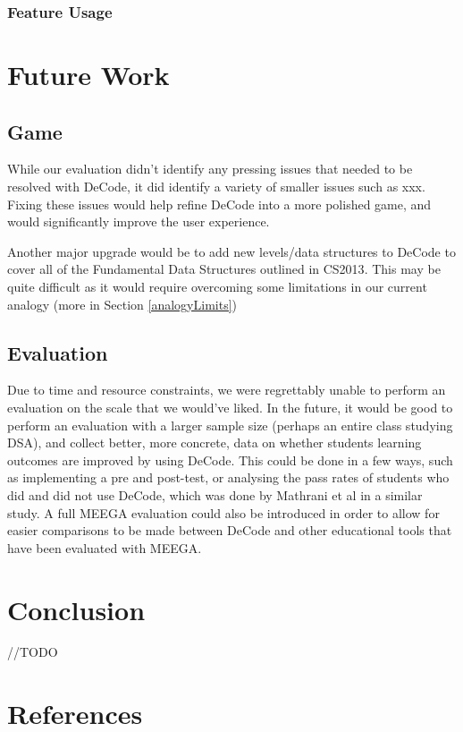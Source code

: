 \documentclass[10pt]{article}
\begin{document}
\subsubsection{Feature Usage}
\section{Future Work}
\subsection{Game}
While our evaluation didn't identify any pressing issues that needed to be resolved with DeCode, it did identify a variety of smaller issues such as xxx. Fixing these issues would help refine DeCode into a more polished game, and would significantly improve the user experience.\par
Another major upgrade would be to add new levels/data structures to DeCode to cover all of the Fundamental Data Structures outlined in CS2013\cite{CS2013}. This may be quite difficult as it would require overcoming some limitations in our current analogy (more in Section \ref{analogyLimits})
\subsection{Evaluation}
Due to time and resource constraints, we were regrettably unable to perform an evaluation on the scale that we would've liked. In the future, it would be good to perform an evaluation with a larger sample size (perhaps an entire class studying DSA), and collect better, more concrete, data on whether students learning outcomes are improved by using DeCode. This could be done in a few ways, such as implementing a pre and post-test, or analysing the pass rates of students who did and did not use DeCode, which was done by Mathrani et al\cite{mathrani} in a similar study. A full MEEGA\cite{Rafael} evaluation could also be introduced in order to allow for easier comparisons to be made between DeCode and other educational tools that have been evaluated with MEEGA.
\section{Conclusion}
//TODO
\begingroup

\section*{References}
  \vspace{2mm}

  \renewcommand{\section}[2]{}

  \begin{spacing}{1.0}

    
    \small
    

  \end{spacing}

\endgroup
\end{document}
